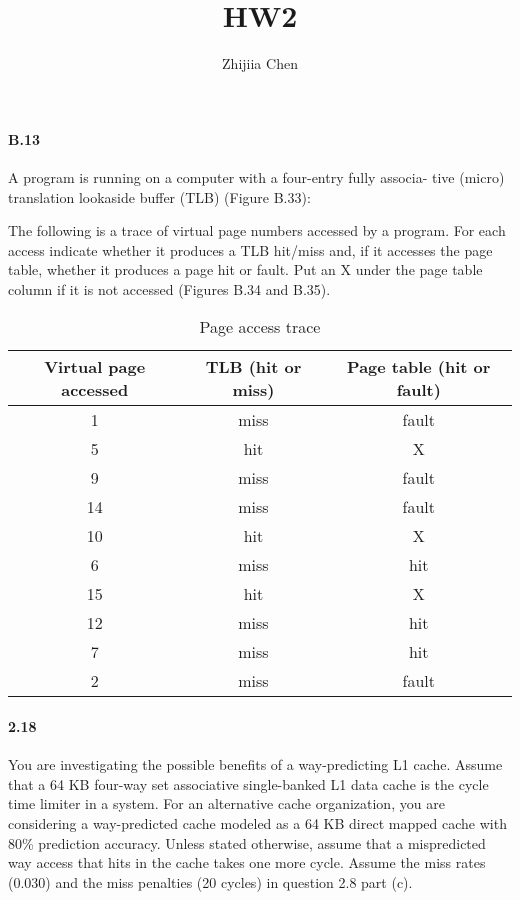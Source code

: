 \documentclass{article}
\title{HW2}
\author{Zhijiia Chen}
\begin{document}
\maketitle

\paragraph{B.13} A program is running on a computer with a four-entry fully associa- tive (micro) translation lookaside buffer (TLB) (Figure B.33):

The following is a trace of virtual page numbers accessed by a program. For each access indicate whether it produces a TLB hit/miss and, if it accesses the page table, whether it produces a page hit or fault. Put an X under the page table column if it is not accessed (Figures B.34 and B.35).

\begin{table}[h!]
\begin{center}
    \caption{Page access trace}
    \label{tab:table1}
    \begin{tabular}{c|c|c} %
    \toprule
    \textbf{Virtual page accessed} & \textbf{TLB (hit or miss)} & \textbf{Page table (hit or fault)}\\
    \hline
    1 & miss & fault\\
    \hline
    5 & hit & X\\
    \hline
    9 & miss & fault\\
    \hline
    14 & miss & fault\\
    \hline
    10 & hit & X\\
    \hline
    6 & miss & hit\\
    \hline
    15 & hit & X\\
    \hline
    12 & miss & hit\\
    \hline
    7 & miss & hit\\
    \hline
    2 & miss & fault\\
    \bottomrule
    \end{tabular}
\end{center}
\end{table}

\paragraph{2.18} You are investigating the possible benefits of a way-predicting L1 cache. Assume that a 64 KB four-way set associative single-banked L1 data cache is the cycle time limiter in a system. For an alternative cache organization, you are considering a way-predicted cache modeled as a 64 KB direct mapped cache with 80\% prediction accuracy. Unless stated otherwise, assume that a mispredicted way access that hits in the cache takes one more cycle. Assume the miss rates (0.030) and the miss penalties (20 cycles) in question 2.8 part (c).
\end{document}
